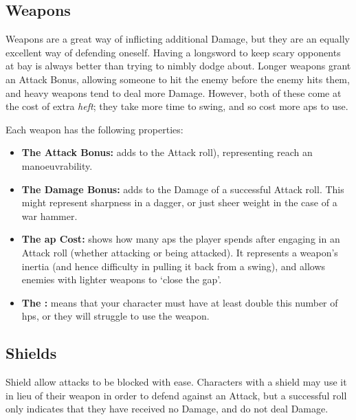 \begin{multicols}{2}

\subsection{Weapons}

\noindent
Weapons are a great way of inflicting additional Damage, but they are an equally excellent way of defending oneself.
Having a longsword to keep scary opponents at bay is always better than trying to nimbly dodge about.
Longer weapons grant an Attack Bonus, allowing someone to hit the enemy before the enemy hits them, and heavy weapons tend to deal more Damage.
However, both of these come at the cost of extra \emph{heft}; they take more time to swing, and so cost more \glspl{ap} to use.

Each weapon has the following properties:

\begin{itemize}

  \item
  \textbf{The Attack Bonus:} adds to the Attack roll), representing reach an manoeuvrability.
  \item
  \textbf{The Damage Bonus:} adds to the Damage of a successful Attack roll.
  This might represent sharpness in a dagger, or just sheer weight in the case of a war hammer.
  \item
  \textbf{The \Gls{ap} Cost:} shows how many \glspl{ap} the player spends after engaging in an Attack roll (whether attacking or being attacked).
  It represents a weapon's inertia (and hence difficulty in pulling it back from a swing), and allows enemies with lighter weapons to `close the gap'.
  \item
  \textbf{The :} means that your character must have at least double this number of \glspl{hp}, or they will struggle to use the weapon.
\end{itemize}

\weaponsChart

\bigLine

\label{weaponschart}

\subsection{Shields}

Shield allow attacks to be blocked with ease.
Characters with a shield may use it in lieu of their weapon in order to defend against an Attack, but a successful roll only indicates that they have received no Damage, and do not deal Damage.


\end{multicols}
